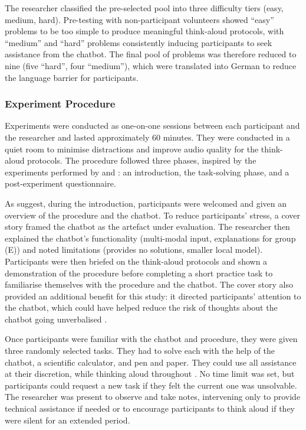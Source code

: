 The researcher classified the pre-selected pool into three difficulty tiers (easy, medium, hard). Pre-testing with non-participant volunteers showed \enquote{easy} problems to be too simple to produce meaningful think-aloud protocols, with \enquote{medium} and \enquote{hard} problems consistently inducing participants to seek assistance from the chatbot. The final pool of problems was therefore reduced to nine (five \enquote{hard}, four \enquote{medium}), which were translated into German to reduce the language barrier for participants.

\subsubsection{Experiment Procedure} \label{sssec:experiment-procedure}

Experiments were conducted as one-on-one sessions between each participant and the researcher and lasted approximately 60 minutes. They were conducted in a quiet room to minimise distractions and improve audio quality for the think-aloud protocols. The procedure followed three phases, inspired by the experiments performed by \textcite{Jussupow2021} and \textcite{Kazemitabaar2024}: an introduction, the task-solving phase, and a post-experiment questionnaire.

As \textcite{VanSomeren1994} suggest, during the introduction, participants were welcomed and given an overview of the procedure and the chatbot. To reduce participants' stress, a cover story framed the chatbot as the artefact under evaluation. The researcher then explained the chatbot's functionality (multi-modal input, explanations for group (E)) and noted limitations (provides no solutions, smaller local model). Participants were then briefed on the think-aloud protocols and shown a demonstration of the procedure before completing a short practice task to familiarise themselves with the procedure and the chatbot. The cover story also provided an additional benefit for this study: it directed participants' attention to the chatbot, which could have helped reduce the risk of thoughts about the chatbot going unverbalised \parencite{Ericsson2017}.

Once participants were familiar with the chatbot and procedure, they were given three randomly selected tasks. They had to solve each with the help of the chatbot, a scientific calculator, and pen and paper. They could use all assistance at their discretion, while thinking aloud throughout \parencite{VanSomeren1994}. No time limit was set, but participants could request a new task if they felt the current one was unsolvable. The researcher was present to observe and take notes, intervening only to provide technical assistance if needed or to encourage participants to think aloud if they were silent for an extended period.


